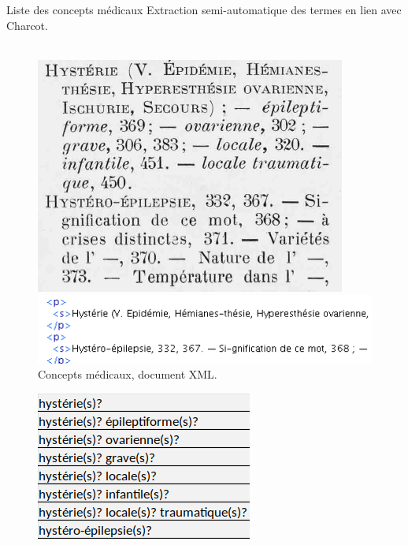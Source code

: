 \begin{frame}{Liste des concepts médicaux}
Extraction semi-automatique des termes en lien avec Charcot.\\~\\

 \begin{figure}[!htb]
    \centering
    \begin{minipage}{.5\textwidth}
        \centering
        \includegraphics[width=0.6\linewidth, height=0.3\textheight]{pic/concepts-pdf}
        \caption{Index des termes \citep{charcot1890oeuvres}.}
        \label{fig:prob1_6_2}
    \end{minipage}%
    \begin{minipage}{.5\textwidth}
        \centering
        \includegraphics[width=1\linewidth, height=0.15\textheight]{pic/concepts-xml}
        \caption{Concepts médicaux, document XML.}
        \label{fig:prob1_6_1}
    \end{minipage}
\end{figure}
 \begin{figure}[!htb]
    \centering
    \begin{minipage}{.5\textwidth}
        \centering
        \includegraphics[width=0.6\linewidth, height=0.25\textheight]{pic/concepts-csv}

\end{minipage}
\end{figure}
\end{frame}

